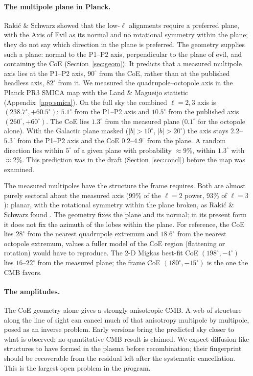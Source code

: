 \documentclass[11pt,a4paper]{article}
\newcommand{\dg}{^\circ}
\begin{document}
\paragraph{The multipole plane in Planck.} Raki\'c \& Schwarz \cite{RS07} showed that the low-$\ell$ alignments require a preferred plane, with the Axis of Evil as its normal and no rotational symmetry within the plane; they do not say which direction in the plane is preferred. The geometry supplies such a plane: normal to the P1--P2 axis, perpendicular to the plane of evil, and containing the CoE (Section~\ref{sec:geom}). It predicts that a measured multipole axis lies at the P1--P2 axis, $90\dg$ from the CoE, rather than at the published headless axis, $82\dg$ from it. We measured the quadrupole--octopole axis in the Planck PR3 SMICA map \cite{Planck18IV} with the Land \& Magueijo statistic \cite{LM05} (Appendix~\ref{app:smica}). On the full sky the combined $\ell=2,3$ axis is $(238.7\dg,+60.5\dg)$: $5.1\dg$ from the P1--P2 axis and $10.5\dg$ from the published axis $(260\dg,+60\dg)$. The CoE lies $1.3\dg$ from the measured plane ($0.1\dg$ for the octopole alone). With the Galactic plane masked ($|b|>10\dg$, $|b|>20\dg$) the axis stays $2.2$--$5.3\dg$ from the P1--P2 axis and the CoE $0.2$--$4.9\dg$ from the plane. A random direction lies within $5\dg$ of a given plane with probability $\approx9\%$, within $1.3\dg$ with $\approx2\%$. This prediction was in the draft (Section~\ref{sec:concl}) before the map was examined.

The measured multipoles have the structure the frame requires. Both are almost purely sectoral about the measured axis (99\% of the $\ell=2$ power, 93\% of $\ell=3$): planar, with the rotational symmetry within the plane broken, as Raki\'c \& Schwarz found \cite{RS07}. The geometry fixes the plane and its normal; in its present form it does not fix the azimuth of the lobes within the plane. For reference, the CoE lies $28\dg$ from the nearest quadrupole extremum and $18.6\dg$ from the nearest octopole extremum, values a fuller model of the CoE region (flattening or rotation) would have to reproduce. The 2-D Migkas best-fit CoE $(198\dg,-4\dg)$ lies $16$--$22\dg$ from the measured plane; the frame CoE $(180\dg,-15\dg)$ is the one the CMB favors.

\paragraph{The amplitudes.} The CoE geometry alone gives a strongly anisotropic CMB. A web of structure along the line of sight can cancel much of that anisotropy multipole by multipole, posed as an inverse problem. Early versions bring the predicted sky closer to what is observed; no quantitative CMB result is claimed. We expect diffusion-like structures to have formed in the plasma before recombination; their fingerprint should be recoverable from the residual left after the systematic cancellation. This is the largest open problem in the program.
\end{document}
